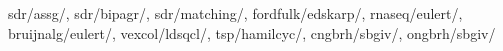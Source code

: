 sdr/assg/,
sdr/bipagr/,
sdr/matching/,
fordfulk/edskarp/,
rnaseq/eulert/,
bruijnalg/eulert/,
vexcol/ldsqcl/,
tsp/hamilcyc/,
cngbrh/sbgiv/,
ongbrh/sbgiv/